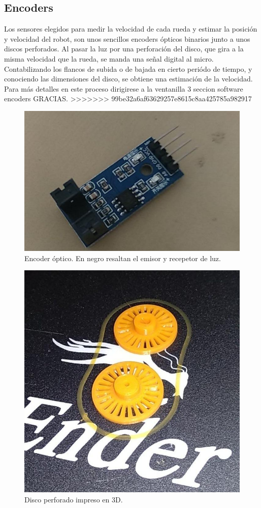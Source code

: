 \subsection{Encoders}\label{enc_hard}
Los sensores elegidos para medir la velocidad de cada rueda y estimar la posición y velocidad del robot, son unos sencillos encoders ópticos binarios junto a unos discos perforados. Al pasar la luz por una perforación del disco, que gira a la misma velocidad que la rueda, se manda una señal digital al micro. Contabilizando los flancos de subida o de bajada en cierto periódo de tiempo, y conociendo las dimensiones del disco, se obtiene una estimación de la velocidad. Para más detalles en este proceso dirigirese a la ventanilla 3 seccion software encoders GRACIAS. 
>>>>>>> 99be32a6af63629257e8615c8aa425785a982917
 \begin{figure}[h!]
 	\centering
 	\includegraphics[width=.6\textwidth]{images/hw/encoder_img}
 	\caption{Encoder óptico. En negro resaltan el emisor y recepetor de luz.}
 \end{figure}
  \begin{figure}[h!]
  	\centering
  	\includegraphics[width=.6\textwidth]{images/hw/encoder_stl}
  	\caption{Disco perforado impreso en 3D.}
  \end{figure}
  
